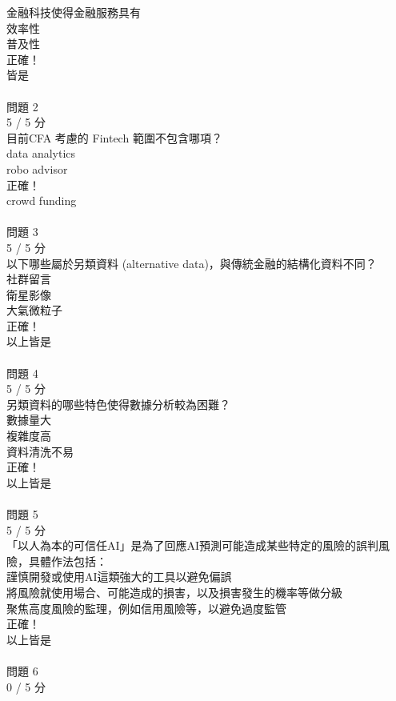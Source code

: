 \begin{multicols}{3}
金融科技使得金融服務具有\\
  效率性 \\
  普及性 \\
正確！\\
  皆是 \\
 \\
問題 2\\
5 / 5 分\\
目前CFA 考慮的 Fintech 範圍不包含哪項？\\
  data analytics \\
  robo advisor \\
正確！\\
  crowd funding \\
 \\
問題 3\\
5 / 5 分\\
以下哪些屬於另類資料 (alternative data)，與傳統金融的結構化資料不同？\\
  社群留言 \\
  衛星影像 \\
  大氣微粒子 \\
正確！\\
  以上皆是 \\
 \\
問題 4\\
5 / 5 分\\
另類資料的哪些特色使得數據分析較為困難？\\
  數據量大 \\
  複雜度高 \\
  資料清洗不易 \\
正確！\\
  以上皆是 \\
 \\
問題 5\\
5 / 5 分\\
「以人為本的可信任AI」是為了回應AI預測可能造成某些特定的風險的誤判風險，具體作法包括：\\
  謹慎開發或使用AI這類強大的工具以避免偏誤 \\
  將風險就使用場合、可能造成的損害，以及損害發生的機率等做分級 \\
  聚焦高度風險的監理，例如信用風險等，以避免過度監管 \\
正確！\\
  以上皆是 \\
 \\
問題 6\\
0 / 5 分\\

\end{multicols}
